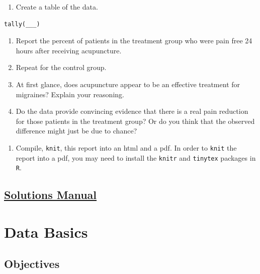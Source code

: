 \documentclass[
  letterpaper,
  DIV=11,
  numbers=noendperiod]{scrreprt}
\providecommand{\tightlist}{%
  \setlength{\itemsep}{0pt}\setlength{\parskip}{0pt}}\usepackage{longtable,booktabs,array}
\begin{document}
\begin{enumerate}
\def\labelenumi{\alph{enumi}.}
\setcounter{enumi}{1}
\tightlist
\item
  Create a table of the data.
\end{enumerate}

\begin{verbatim}
tally(___)
\end{verbatim}

\begin{enumerate}
\def\labelenumi{\alph{enumi}.}
\setcounter{enumi}{2}
\item
  Report the percent of patients in the treatment group who were pain
  free 24 hours after receiving acupuncture.
\item
  Repeat for the control group.
\item
  At first glance, does acupuncture appear to be an effective treatment
  for migraines? Explain your reasoning.
\item
  Do the data provide convincing evidence that there is a real pain
  reduction for those patients in the treatment group? Or do you think
  that the observed difference might just be due to chance?
\end{enumerate}

\begin{enumerate}
\def\labelenumi{\arabic{enumi}.}
\setcounter{enumi}{2}
\tightlist
\item
  Compile, \texttt{knit}, this report into an html and a pdf. In order
  to \texttt{knit} the report into a pdf, you may need to install the
  \texttt{knitr} and \texttt{tinytex} packages in \texttt{R}.
\end{enumerate}

\section*{\texorpdfstring{\href{https://ds-usafa.github.io/CPS-Solutions-Manual/CS1.html}{Solutions
Manual}}{Solutions Manual}}\label{solutions-manual-1}


\chapter{Data Basics}\label{DB}

\section{Objectives}\label{objectives-2}
\end{document}
